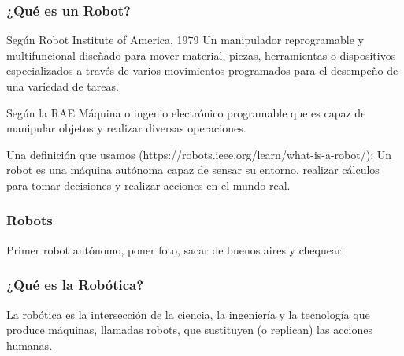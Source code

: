 \begin{frame}
    \frametitle{¿Qué es un Robot?}
    
    Según Robot Institute of America, 1979
    Un manipulador reprogramable y multifuncional diseñado para mover material, piezas, herramientas o dispositivos especializados a través de varios movimientos programados para el desempeño de una variedad de tareas.
    
    Según la RAE
    Máquina o ingenio electrónico programable que es capaz de manipular objetos y realizar diversas operaciones.
    
    Una definición que usamos (https://robots.ieee.org/learn/what-is-a-robot/):
    Un robot es una máquina autónoma capaz de sensar su entorno, realizar cálculos para tomar decisiones y realizar acciones en el mundo real.
    
    \note{}
\end{frame}

\begin{frame}
    \frametitle{Robots}
    Primer robot autónomo, poner foto, sacar de buenos aires y chequear.
\end{frame}

\begin{frame}
    \frametitle{¿Qué es la Robótica?}
    La robótica es la intersección de la ciencia, la ingeniería y la tecnología que produce máquinas, llamadas robots, que sustituyen (o replican) las acciones humanas.
\end{frame}

